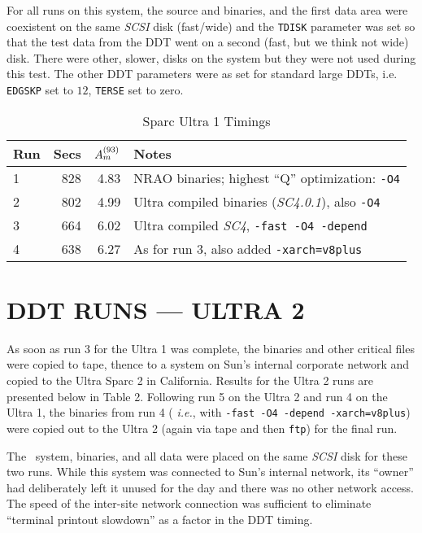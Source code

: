      For all runs on this system, the source and binaries, and the first
data area were coexistent on the same {\it SCSI\/} disk (fast/wide) and
the {\tt TDISK} parameter was set so that the test data from the DDT went
on a second (fast, but we think not wide) disk.  There were other, slower,
disks on the system but they were not used during this test.  The other
DDT parameters were as set for standard large DDTs, i.e. {\tt EDGSKP} set
to $12$, {\tt TERSE} set to zero.

\begin{table}
\protect\begin{center}
\protect\begin{tabular}{|l|r|r|l|} \hline
Run & Secs & $A_m^{(93)} $ & Notes \\ \hline
1 & 828 & 4.83 & NRAO binaries; highest ``Q'' optimization: {\tt -O4} \\
2 & 802 & 4.99 & Ultra compiled binaries ({\it SC4.0.1\/}), also {\tt -O4} \\
3 & 664 & 6.02 & Ultra compiled {\it SC4\/}, {\tt -fast -O4 -depend} \\
4 & 638 & 6.27 & As for run 3, also added {\tt -xarch=v8plus} \\
\hline
\end{tabular}
\end{center}
\caption{Sparc Ultra 1 Timings}
\label{ta:one} %
\end{table}


\section{DDT RUNS --- ULTRA 2}

     As soon as run 3 for the Ultra 1 was complete, the binaries and other
critical files were copied to tape, thence to a system on Sun's internal
corporate network and copied to the Ultra Sparc 2 in California.  Results
for the Ultra 2 runs are presented below in Table 2.  Following run 5 on
the Ultra 2 and run 4 on the Ultra 1, the binaries from run 4 ({\it
i.e.\/}, with {\tt -fast -O4 -depend -xarch=v8plus}) were copied out to
the Ultra 2 (again via tape and then {\tt ftp}) for the final run.

     The \AIPS\ system, binaries, and all data were placed on the same
{\it SCSI\/} disk for these two runs.  While this system was connected to
Sun's internal network, its ``owner'' had deliberately left it unused for
the day and there was no other network access.  The speed of the
inter-site network connection was sufficient to eliminate ``terminal
printout slowdown'' as a factor in the DDT timing.

